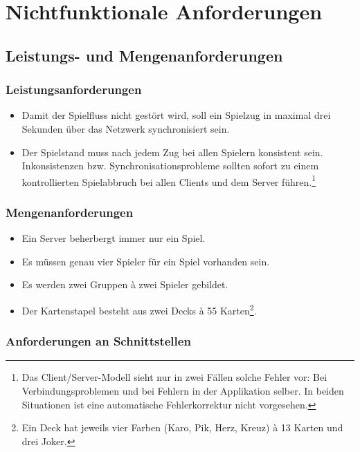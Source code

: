 \documentclass[12pt,halfparskip]{scrartcl}
\begin{document}
\newpage

\section{Nichtfunktionale Anforderungen}\label{cha:nichtfunktionale_anforderungen} %

\subsection{Leistungs- und Mengenanforderungen}\label{sub:leistungs_und_mengenanforderungen} %
\subsubsection{Leistungsanforderungen}\label{ssub:leistungsanforderungen} %
\begin{itemize}
	\item Damit der Spielfluss nicht gestört wird, soll ein Spielzug in maximal drei Sekunden über das Netzwerk synchronisiert sein.
	\item Der Spielstand muss nach jedem Zug bei allen Spielern konsistent sein. Inkonsistenzen bzw. Synchronisationsprobleme sollten sofort zu einem kontrollierten Spielabbruch bei allen Clients und dem Server führen.\footnote{Das Client/Server-Modell sieht nur in zwei Fällen solche Fehler vor: Bei Verbindungsproblemen und bei Fehlern in der Applikation selber. In beiden Situationen ist eine automatische Fehlerkorrektur nicht vorgesehen.}
\end{itemize}
\subsubsection{Mengenanforderungen}\label{ssub:mengenanforderungen} %
\begin{itemize}
	\item Ein Server beherbergt immer nur ein Spiel.
	\item Es müssen genau vier Spieler für ein Spiel vorhanden sein.
	\item Es werden zwei Gruppen à zwei Spieler gebildet.
	\item Der Kartenstapel besteht aus zwei Decks à 55 Karten\footnote{Ein Deck hat jeweils vier Farben (Karo, Pik, Herz, Kreuz) à 13 Karten und drei Joker.}.
\end{itemize}

\subsubsection{Anforderungen an Schnittstellen}\label{ssub:anforderungen_an_schnittstellen} %
\end{document}
